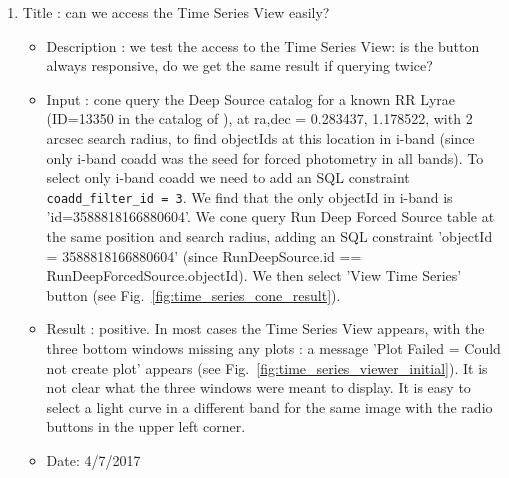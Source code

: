 \documentclass[DM,lsstdraft,toc,usenatbib]{lsstdoc}
\begin{document}
\begin{enumerate}
   \item Title : can we access the Time Series View easily?
    \begin{itemize}
      \item Description : we test the access to the Time Series View: is the button always responsive, do we get the same result if querying twice? 
      \item Input : cone query the Deep Source catalog for a known RR Lyrae (ID=13350 in the catalog of \citep{sesar2010} ),  at ra,dec = 0.283437\degree, 1.178522\degree, with 2 arcsec search radius, to find objectIds at this location  in i-band (since only i-band coadd was the seed for forced photometry in all bands).  To select only i-band coadd we need to  add an SQL constraint \verb|coadd_filter_id = 3|.  We find that the only objectId in i-band is 'id=3588818166880604'.  We  cone query Run Deep Forced Source table at the same position and search radius, adding an SQL constraint  'objectId = 3588818166880604' (since RunDeepSource.id == RunDeepForcedSource.objectId). We then select 'View Time Series' button (see Fig.~\ref{fig:time_series_cone_result}).  
      \item Result : positive. In most cases the Time Series View appears,  with the three bottom windows missing any plots : a message 'Plot Failed = Could not create plot' appears (see Fig.~\ref{fig:time_series_viewer_initial}).  It is not clear what the three windows were meant to display. It is easy to select a light curve in a different band for the same image with the radio buttons in the upper left corner. 
      \item Date: 4/7/2017
    \end{itemize}


\end{enumerate}
\end{document}

